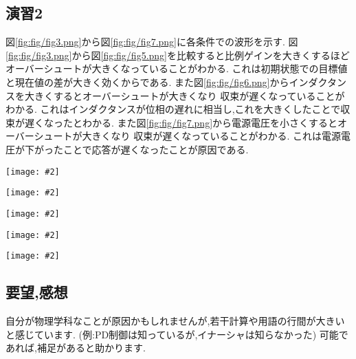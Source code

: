\documentclass[uplatex,a4j,11pt,dvipdfmx]{jsarticle}
\makeatletter
\def\fgcaption{\def\@captype{figure}\caption}
\newcommand{\mfig}[3][width=15cm]{
\begin{center}
\texttt{[image: \#2]}
\fgcaption{#3 \label{fig:#2}}
\end{center}
}
\makeatother
\begin{document}
\subsection*{演習2}
図\ref{fig:fig/fig3.png}から図\ref{fig:fig/fig7.png}に各条件での波形を示す.
図\ref{fig:fig/fig3.png}から図\ref{fig:fig/fig5.png}を比較すると比例ゲインを大きくするほど
オーバーシュートが大きくなっていることがわかる.
これは初期状態での目標値と現在値の差が大きく効くからである.
また図\ref{fig:fig/fig6.png}からインダクタンスを大きくするとオーバーシュートが大きくなり
収束が遅くなっていることがわかる.
これはインダクタンスが位相の遅れに相当し,これを大きくしたことで収束が遅くなったとわかる.
また図\ref{fig:fig/fig7.png}から電源電圧を小さくするとオーバーシュートが大きくなり
収束が遅くなっていることがわかる.
これは電源電圧が下がったことで応答が遅くなったことが原因である.
\mfig[width=14cm]{fig/fig3.png}{条件1の波形}
\mfig[width=14cm]{fig/fig4.png}{条件2の波形}
\mfig[width=14cm]{fig/fig5.png}{条件3の波形}
\mfig[width=14cm]{fig/fig6.png}{条件4の波形}
\mfig[width=14cm]{fig/fig7.png}{条件5の波形}
\subsection*{要望,感想}
自分が物理学科なことが原因かもしれませんが,若干計算や用語の行間が大きいと感じています.
(例:PD制御は知っているが,イナーシャは知らなかった)
可能であれば,補足があると助かります.
\end{document}
